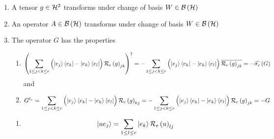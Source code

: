 \begin{theorem}
\begin{remark}
\begin{enumerate}
\item A tensor $g\in {\cal H}^{2}$ transforms under change of basis $W\in 
{\cal B}\left( {\cal H}\right) $%
\begin{equation}
\end{equation}

\item An operator $A\in {\cal B}\left( {\cal H}\right) $ transforms under
change of basis $W\in {\cal B}\left( {\cal H}\right) $%
\begin{equation}
\end{equation}

\item The operator $G$ has the properties

\begin{enumerate}
\item 
\begin{equation}
\left( \sum_{1\leq j<k\leq r}\left( \stackrel{}{\left\vert
e_{j}\right\rangle \left\langle e_{k}\right\vert -\left\vert
e_{k}\right\rangle \left\langle e_{l}\right\vert }\right) {\cal R}_{e}\left(
g\right) _{jk}\right) ^{\dagger }=-\sum_{1\leq j<k\leq r}\left( \stackrel{}{%
\left\vert e_{j}\right\rangle \left\langle e_{k}\right\vert -\left\vert
e_{k}\right\rangle \left\langle e_{l}\right\vert }\right) \overline{{\cal R}%
_{e}\left( g\right) _{jk}}=-\widehat{\sigma _{e}}\left( G\right)
\end{equation}%
and

\item 
\begin{equation}
G^{t_{e}}=\sum_{1\leq j<k\leq r}\left( \stackrel{}{\left\vert
e_{j}\right\rangle \left\langle e_{k}\right\vert -\left\vert
e_{k}\right\rangle \left\langle e_{l}\right\vert }\right) {\cal R}_{e}\left(
g\right) _{kj}=-\sum_{1\leq j<k\leq r}\left( \stackrel{}{\left\vert
e_{j}\right\rangle \left\langle e_{k}\right\vert -\left\vert
e_{k}\right\rangle \left\langle e_{l}\right\vert }\right) {\cal R}_{e}\left(
g\right) _{jk}=-G
\end{equation}
\end{enumerate}

\begin{enumerate}
\item 
\begin{equation}
\left\vert ue_{j}\right\rangle =\sum_{1\leq l\leq r}\left\vert
e_{k}\right\rangle {\cal R}_{e}\left( u\right) _{lj}
\end{equation}


\end{enumerate}
\end{enumerate}
\end{remark}
\end{theorem}
